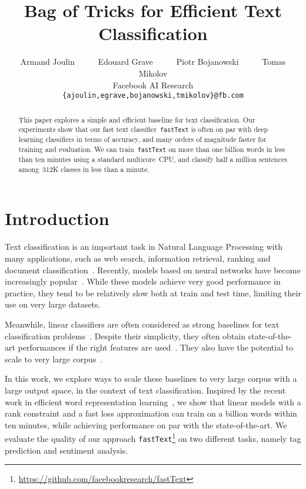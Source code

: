 \documentclass[11pt,letterpaper]{article}
\title{Bag of Tricks for Efficient Text Classification} %
\author{
Armand Joulin~~~~~ 
Edouard Grave~~~~~
Piotr Bojanowski~~~~~
Tomas Mikolov \\
Facebook AI Research\\
\texttt{\{ajoulin,egrave,bojanowski,tmikolov\}@fb.com}
}
\date{}
\begin{document}
\maketitle

\begin{abstract}
This paper explores a simple and efficient baseline for text classification.
Our experiments show that our fast text classifier~\texttt{fastText} is often
on par with deep learning classifiers in terms of accuracy, and many orders of
magnitude faster for training and evaluation.  We can train~\texttt{fastText}
on more than one billion words in less than ten minutes using a standard
multicore~CPU, and classify half a million sentences among~312K classes in less
than a minute.  
\end{abstract}

\section{Introduction}

Text classification is an important task in Natural Language Processing with many
applications, such as web search, information retrieval, ranking and
document classification~\cite{deerwester1990indexing,pang2008opinion}.
Recently, models based on neural networks have become increasingly
popular~\cite{kim2014convolutional,zhang2015text,conneau2016}.
While these models achieve very good performance in practice, they tend to be
relatively slow both at train and test time, limiting their use on very large
datasets.

Meanwhile, linear classifiers are often considered as strong baselines for text
classification
problems~\cite{joachims1998text,mccallum1998comparison,fan2008liblinear}.
Despite their simplicity, they often obtain state-of-the-art performances if
the right features are used~\cite{wang2012baselines}.  They also have the
potential to scale to very large corpus~\cite{agarwal2014reliable}.

In this work, we explore ways to scale these baselines to very large corpus
with a large output space, in the context of text classification. Inspired by
the recent work in efficient word representation
learning~\cite{mikolov2013efficient,levy2014neural}, we show that
linear models with a rank constraint and a fast loss approximation can train on a billion
words within ten minutes, while achieving performance on par with the state-of-the-art.
We evaluate the quality of our approach \texttt{fastText}\footnote{\url{https://github.com/facebookresearch/fastText}} on two
different tasks, namely tag prediction and sentiment analysis.
\end{document}
